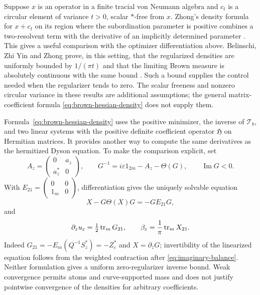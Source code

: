 \begin{remark}
\label{rem:brown-circular-addition}
Suppose $x$ is an operator in a finite tracial von Neumann algebra and $c_t$ is a circular element of variance $t>0$, scalar $*$-free from $x$.
Zhong's density formula for $x+c_t$ on its region where the subordination parameter is positive combines a two-resolvent term with the derivative of an implicitly determined parameter \cite[arXiv version, Theorem~4.2]{Zho26}.
This gives a useful comparison with the optimizer differentiation above.
Belinschi, Zhi Yin and Zhong prove, in this setting, that the regularized densities are uniformly bounded by $1/(\pi t)$ and that the limiting Brown measure is absolutely continuous with the same bound \cite[arXiv version, Theorem~7.10 and Lemma~7.11]{BYZ24}.
Such a bound supplies the control needed when the regularizer tends to zero.
The scalar freeness and nonzero circular variance in these results are additional assumptions; the general matrix-coefficient formula \eqref{eq:brown-hessian-density} does not supply them.
\end{remark}

Formula~\eqref{eq:brown-hessian-density} uses the positive minimizer, the inverse of $\mathcal T_b$, and two linear systems with the positive definite coefficient operator $\mathfrak H$ on Hermitian matrices.
It provides another way to compute the same derivatives as the hermitized Dyson equation.
To make the comparison explicit, set
\[
 A_z=\begin{pmatrix}0&a_z\\a_z^*&0\end{pmatrix},\qquad
 G^{-1}=i\varepsilon1_{2m}-A_z-\Theta(G),\qquad
 \operatorname{Im}G<0.
\]
With $E_{21}=\left(\begin{smallmatrix}0&0\\1_m&0\end{smallmatrix}\right)$, differentiation gives the uniquely solvable equation
\begin{equation}\label{eq:linearized-dyson}
 X-G\Theta(X)G=-GE_{21}G,
\end{equation}
and
\begin{equation}\label{eq:potential-derivatives}
 \partial_z u_\varepsilon=\tfrac12\operatorname{tr}_mG_{21},\qquad
 \beta_\varepsilon=\frac1\pi\operatorname{tr}_mX_{21}.
\end{equation}
Indeed $G_{21}=-E_m(Q^{-1}S_z^*)=-Z_\varepsilon^*$ and $X=\partial_{\bar z}G$; invertibility of the linearized equation follows from the weighted contraction after \eqref{eq:imaginary-balance}.
Neither formulation gives a uniform zero-regularizer inverse bound.
Weak convergence permits atoms and curve-supported mass and does not justify pointwise convergence of the densities for arbitrary coefficients.

